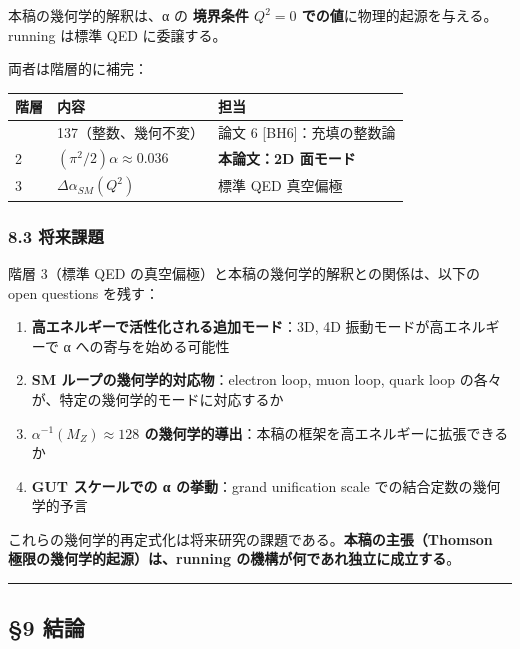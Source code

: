 \documentclass[
  11pt]{ltjsarticle}
\newcounter{none} %
\providecommand{\tightlist}{%
  \setlength{\itemsep}{0pt}\setlength{\parskip}{0pt}}
\begin{document}
本稿の幾何学的解釈は、α の \textbf{境界条件 \(Q^2 = 0\)
での値}に物理的起源を与える。 running は標準 QED に委譲する。

両者は階層的に補完：

{\def\LTcaptype{none} %
\begin{longtable}[]{@{}lll@{}}
\toprule\noalign{}
階層 & 内容 & 担当 \\
\midrule\noalign{}
\endhead
\bottomrule\noalign{}
\endlastfoot
1 & 137（整数、幾何不変） & 論文 6 {[}BH6{]}：充填の整数論 \\
2 & \((\pi^2/2)\alpha \approx 0.036\) & \textbf{本論文：2D 面モード} \\
3 & \(\Delta\alpha_{SM}(Q^2)\) & 標準 QED 真空偏極 \\
\end{longtable}
}

\subsubsection{8.3 将来課題}\label{ux5c06ux6765ux8ab2ux984c}

階層 3（標準 QED の真空偏極）と本稿の幾何学的解釈との関係は、以下の open
questions を残す：

\begin{enumerate}
\def\labelenumi{\arabic{enumi}.}
\tightlist
\item
  \textbf{高エネルギーで活性化される追加モード}：3D, 4D
  振動モードが高エネルギーで α への寄与を始める可能性
\item
  \textbf{SM ループの幾何学的対応物}：electron loop, muon loop, quark
  loop の各々が、特定の幾何学的モードに対応するか
\item
  \textbf{\(\alpha^{-1}(M_Z) \approx 128\)
  の幾何学的導出}：本稿の框架を高エネルギーに拡張できるか
\item
  \textbf{GUT スケールでの α の挙動}：grand unification scale
  での結合定数の幾何学的予言
\end{enumerate}

これらの幾何学的再定式化は将来研究の課題である。\textbf{本稿の主張（Thomson
極限の幾何学的起源）は、running の機構が何であれ独立に成立する}。

\begin{center}\rule{0.5\linewidth}{0.5pt}\end{center}

\subsection{§9 結論}\label{ux7d50ux8ad6}
\end{document}

